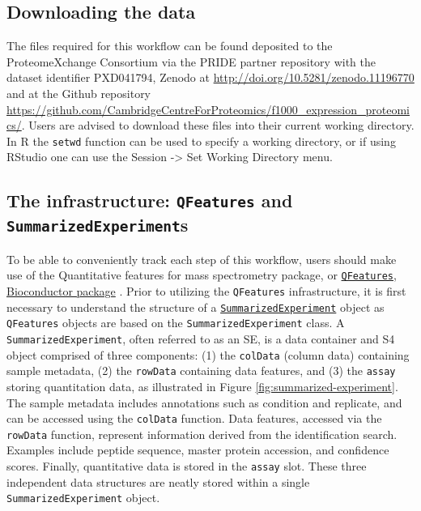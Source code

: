 \documentclass[9pt,a4paper,]{extarticle}
\begin{document}
\subsection{Downloading the data}\label{downloading-the-data}

The files required for this workflow can be found deposited to the ProteomeXchange
Consortium via the PRIDE \citep{PerezRiverol2021, Deutsch2022} partner repository
with the dataset identifier PXD041794, Zenodo at \url{http://doi.org/10.5281/zenodo.11196770}
and at the Github repository \url{https://github.com/CambridgeCentreForProteomics/f1000_expression_proteomics/}.
Users are advised to download these files into their current working directory.
In R the \texttt{setwd} function can be used to specify a working directory, or if
using RStudio one can use the Session -\textgreater{} Set Working Directory menu.

\subsection{\texorpdfstring{The infrastructure: \texttt{QFeatures} and \texttt{SummarizedExperiment}s}{The infrastructure: QFeatures and SummarizedExperiments}}\label{the-infrastructure-qfeatures-and-summarizedexperiments}

To be able to conveniently track each step of this workflow, users should make
use of the Quantitative features for mass spectrometry package, or
\href{https://www.bioconductor.org/packages/release/bioc/html/QFeatures.html}{\texttt{QFeatures}, Bioconductor package} \citep{QFeat}. Prior to utilizing the \texttt{QFeatures} infrastructure, it is first necessary to
understand the structure of a \href{https://bioconductor.org/packages/release/bioc/html/SummarizedExperiment.html}{\texttt{SummarizedExperiment}} \citep{SumExp} object as \texttt{QFeatures} objects are based on the \texttt{SummarizedExperiment}
class. A \texttt{SummarizedExperiment}, often referred to as an SE, is a data container
and S4 object comprised of three components: (1) the \texttt{colData} (column data)
containing sample metadata, (2) the \texttt{rowData} containing data features, and (3)
the \texttt{assay} storing quantitation data, as illustrated in Figure
\ref{fig:summarized-experiment}. The sample metadata includes annotations such
as condition and replicate, and can be accessed using the \texttt{colData} function.
Data features, accessed via the \texttt{rowData} function, represent information
derived from the identification search. Examples include peptide sequence,
master protein accession, and confidence scores. Finally, quantitative data is
stored in the \texttt{assay} slot. These three independent data structures are neatly
stored within a single \texttt{SummarizedExperiment} object.
\end{document}
